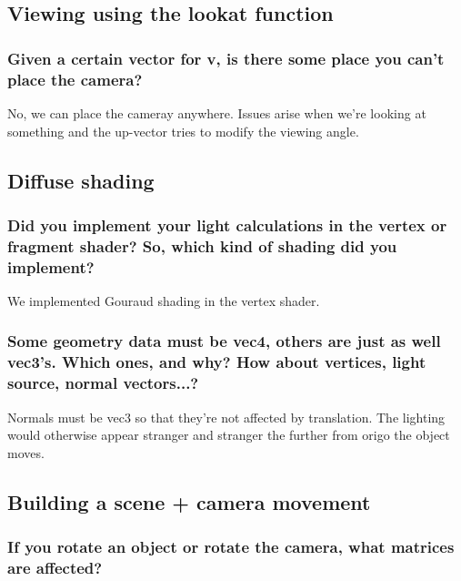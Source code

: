 \documentclass[a4paper,12pt]{article}
\begin{document}
\subsection{Viewing using the lookat function}
\subsubsection{Given a certain vector for v, is there some place you can't place the camera?}
No, we can place the cameray anywhere. Issues arise when we're looking at something and the up-vector tries to modify the viewing angle.

\subsection{Diffuse shading}
\subsubsection{Did you implement your light calculations in the vertex or fragment shader? So, which kind of shading did you implement?}
We implemented Gouraud shading in the vertex shader.

\subsubsection{Some geometry data must be vec4, others are just as well vec3's. Which ones, and why? How about vertices, light source, normal vectors...?}
Normals must be vec3 so that they're not affected by translation. The lighting would otherwise appear stranger and stranger the further from origo the object moves.

\subsection{Building a scene + camera movement}
\subsubsection{If you rotate an object or rotate the camera, what matrices are affected?}
\end{document}
